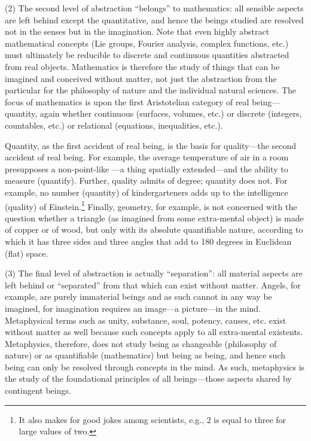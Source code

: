(2) The second level of abstraction ``belongs'' to mathematics: all sensible aspects are left behind except the quantitative, and hence the beings studied are resolved not in the senses but in the imagination. Note that even highly abstract mathematical concepts (Lie groups, Fourier analysis, complex functions, etc.) must ultimately be reducible to discrete and continuous quantities abstracted from real objects. Mathematics is therefore the study of things that can be imagined and conceived without matter, not just the abstraction from the particular for the philosophy of nature and the individual natural sciences. The focus of mathematics is upon the first Aristotelian category of real being---quantity, again whether continuous (surfaces, volumes, etc.) or discrete (integers, countables, etc.) or relational (equations, inequalities, etc.).

Quantity, as the first accident of real being, is the basis for quality---the second accident of real being. For example, the average temperature of air in a room presupposes a non-point-like ---a thing spatially extended---and the ability to measure (quantify). Further, quality admits of degree; quantity does not. For example, no number (quantity) of kindergarteners adds up to the intelligence (quality) of Einstein.\footnote{It also makes for good jokes among scientists, e.g., 2 is equal to three for large values of two.} Finally, geometry, for example, is not concerned with the question whether a triangle (as imagined from some extra-mental object) is made of copper or of wood, but only with its absolute quantifiable nature, according to which it has three sides and three angles that add to 180 degrees in Euclidean (flat) space.

(3) The final level of abstraction is actually ``separation'': all material aspects are left behind or ``separated'' from that which can exist without matter. Angels, for example, are purely immaterial beings and as such cannot in any way be imagined, for imagination requires an image---a picture---in the mind. Metaphysical terms such as unity, substance, soul, potency, causes, etc. exist without matter as well because such concepts apply to all extra-mental existents. Metaphysics, therefore, does not study being as changeable (philosophy of nature) or as quantifiable (mathematics) but being as being, and hence such being can only be resolved through concepts in the mind. As such, metaphysics is the study of the foundational principles of all beings---those aspects shared by  contingent beings.

